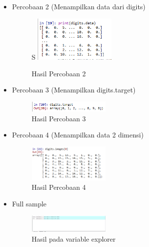\begin{itemize}
\begin{figure}[H]
	\end{figure}
	\item Percobaan 2 (Menampilkan data dari digits) \hfill \break 
	\begin{figure}[H]S
		\includegraphics[width=4cm]{figures/1174035/chapter1/2_2_hasil.png}
		\centering
		\caption{Hasil Percobaan 2}
	\end{figure}
	\item Percobaan 3 (Menampilkan digits.target) \hfill \break 
	\begin{figure}[H]
		\includegraphics[width=4cm]{figures/1174035/chapter1/2_3_hasil.png}
		\centering
		\caption{Hasil Percobaan 3}
	\end{figure}
	\item Percobaan 4 (Menampilkan data 2 dimensi) \hfill \break 
	\begin{figure}[H]
		\includegraphics[width=4cm]{figures/1174035/chapter1/2_4_hasil.png}
		\centering
		\caption{Hasil Percobaan 4}
	\end{figure}
	\item Full sample \hfill \break 
	\begin{figure}[H]
		\includegraphics[width=4cm]{figures/1174035/chapter1/2_var.png}
		\centering
		\caption{Hasil pada variable explorer}
	\end{figure}
\end{itemize}
